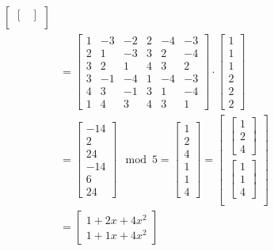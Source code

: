 \begin{align*}
{\begin{bmatrix}
\begin{bmatrix}
    \end{bmatrix} \\
  \end{bmatrix}
  }               \\
            & = {
  \begin{bmatrix}
    1 & -3 & -2 & 2 & -4 & -3 \\
    2 & 1  & -3 & 3 & 2  & -4 \\
    3 & 2  & 1  & 4 & 3  & 2  \\
    3 & -1 & -4 & 1 & -4 & -3 \\
    4 & 3  & -1 & 3 & 1  & -4 \\
    1 & 4  & 3  & 4 & 3  & 1 
  \end{bmatrix}
  \cdot
  \begin{bmatrix}
    1 \\
    1 \\
    1 \\
    2 \\
    2 \\
    2 
  \end{bmatrix}
  }               \\
            & = {
  \begin{bmatrix}
    -14 \\
    2   \\
    24  \\
    -14 \\
    6   \\
    24
  \end{bmatrix}
  \mod 5
  }
  = {
  \begin{bmatrix}
    1 \\
    2 \\
    4 \\
    1 \\
    1 \\
    4
  \end{bmatrix}
  }
  = {
  \begin{bmatrix}
    \begin{bmatrix}
      1 \\
      2 \\
      4
    \end{bmatrix} \\
    \begin{bmatrix}
      1 \\
      1 \\
      4
    \end{bmatrix} \\
  \end{bmatrix}
  }               \\
            & = {
  \begin{bmatrix}
    1+2x+4x^2 \\
    1+1x+4x^2
  \end{bmatrix}
  }
\end{align*}


